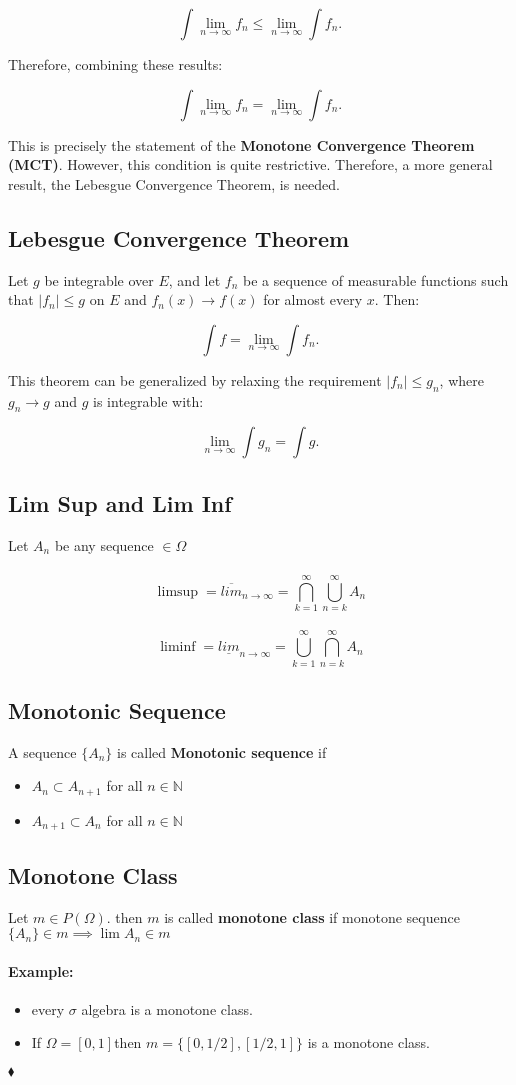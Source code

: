 \documentclass{article}
\newenvironment{example}{\paragraph{Example:}}{\hfill $\blacklozenge $}
\begin{document}
\[\int \lim_{n \to \infty} f_n \leq \lim_{n \to \infty} \int f_n.\]

Therefore, combining these results:

\[\int \lim_{n \to \infty} f_n = \lim_{n \to \infty} \int f_n.\]

This is precisely the statement of the \textbf{Monotone Convergence Theorem (MCT)}. However, this condition is quite restrictive. Therefore, a more general result, the Lebesgue Convergence Theorem, is needed.

\subsection{Lebesgue Convergence Theorem}

Let \( g \) be integrable over \( E \), and let \( f_n \) be a sequence of measurable functions such that \( |f_n| \leq g \) on \( E \) and \( f_n(x) \to f(x) \) for almost every \( x \). Then:

\[\int f = \lim_{n \to \infty} \int f_n.\]

This theorem can be generalized by relaxing the requirement \( |f_n| \leq g_n \), where \( g_n \to g \) and \( g \) is integrable with:

\[\lim_{n \to \infty} \int g_n = \int g.\]
\subsection{Lim Sup and Lim Inf}
Let $A_n$ be any sequence $\in \Omega$ \\ \\
$$\limsup = \overline{lim}_{n \to \infty} = \bigcap_{k=1}^{\infty} \bigcup_{n=k}^{\infty} A_n$$
\\
$$\liminf = \underline{lim}_{n \to \infty} = \bigcup_{k=1}^{\infty} \bigcap_{n=k}^{\infty} A_n$$

\subsection{Monotonic Sequence }
A sequence $\{A_n\}$ is called \textbf{Monotonic sequence} if 
\begin{itemize}
    \item $A_n \subset A_{n+1}$  for all $n \in \mathbb{N}$
    \item $A_{n+1} \subset A_{n}$  for all $n \in \mathbb{N}$
\end{itemize}

\subsection{Monotone Class}
Let $m \in P(\Omega)$. then $m$ is called \textbf{monotone class} if monotone sequence $\{A_n\} \in m \implies \lim A_n \in m$  
\begin{example}
    \begin{itemize}
        \item every $\sigma$ algebra is a monotone class.
        \item If $\Omega = [0,1] $then $ m = \{ [0,1/2], [1/2,1]\} $ is a monotone class. 
    \end{itemize}
\end{example}
\end{document}
